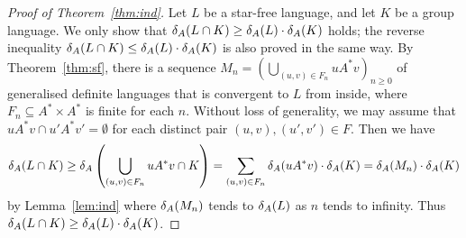 \begin{proof}[Proof of Theorem~\ref{thm:ind}]
Let \(L\) be a star-free language, and let \(K\) be a group language.
We only show that \(\delta_{A}(L \cap K) \geq \delta_{A}(L) \cdot \delta_{A}(K)\) holds;
the reverse inequality \(\delta_{A}(L \cap K) \leq \delta_{A}(L) \cdot \delta_{A}(K)\) is also proved in the same way.
By Theorem~\ref{thm:sf}, there is a sequence \(M_n = (\bigcup_{(u, v) \in F_n} u A^* v)_{n \geq 0}\) of generalised definite languages that is convergent to \(L\) from inside, where \(F_n \subseteq A^* \times A^*\) is finite for each \(n\).
Without loss of generality, we may assume that \(uA^*v \cap u'A^*v' = \emptyset\) for each distinct pair \((u,v), (u',v') \in F\).
Then we have
\[
 \delta_{A}(L \cap K) \geq \delta_{A}\left(\bigcup_{(u,v) \in F_n} u A^* v \cap K\right)
 = \sum_{(u,v) \in F_n} \delta_{A}(u A^* v) \cdot \delta_{A}(K)
 = \delta_{A}(M_n) \cdot \delta_{A}(K)
\]
by Lemma~\ref{lem:ind} where \(\delta_{A}(M_n)\) tends to \(\delta_{A}(L)\) as \(n\) tends to infinity.
Thus \(\delta_{A}(L \cap K) \geq \delta_{A}(L) \cdot \delta_{A}(K)\).
\end{proof}



